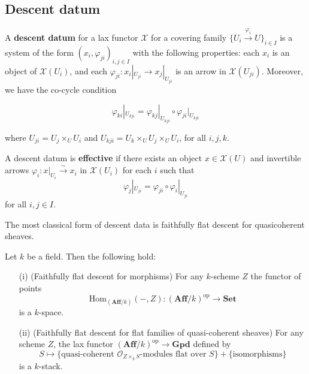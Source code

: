 \documentclass[12pt]{article}
\begin{document}
\subsection{Descent datum}
\begin{definition}
    A \textbf{descent datum} for a lax functor $\mathcal{X}$ for a covering family $\{ U_i \xrightarrow{\varphi_i} U \}_{i \in I}$ is a system of the form
    $(x_i, \varphi_{ji})_{i,j \in I}$ with the following properties: each $x_i$ is an object of $\mathcal{X}(U_i)$, and each
    $\varphi_{ji} : x_i|_{U_{ji}} \to x_j|_{U_{ji}}$ is an arrow in $\mathcal{X}(U_{ji})$. Moreover, we have the co-cycle condition

    \[
        \varphi_{ki}|_{U_{kji}} = \varphi_{kj}|_{U_{kji}} \circ \varphi_{ji}|_{U_{kji}}
    \]

    where $U_{ji} = U_j \times_U U_i$ and $U_{kji} = U_k \times_U U_j \times_U U_i$, for all $i,j,k$.

    A descent datum is \textbf{effective} if there exists an object $x \in \mathcal{X}(U)$ and invertible arrows
    $\varphi_i : x|_{U_i} \xrightarrow{\sim} x_i$ in $\mathcal{X}(U_i)$ for each $i$ such that
    \[
        \varphi_j|_{U_{ji}} = \varphi_{ji} \circ \varphi_i|_{U_{ji}}
    \]
    for all $i,j \in I$.
\end{definition}
The most classical form of descent data is faithfully flat descent for quasicoherent sheaves.
\begin{theorem}
    Let $k$ be a field. Then the following hold:
    \begin{enumerate}
        \item[(i)] (Faithfully flat descent for morphisms) For any $k$-scheme $Z$ the functor of points
              \[
                  \mathrm{Hom}_{(\mathbf{Aff}/k)}(-, Z) : (\mathbf{Aff}/k)^{\mathrm{op}} \to \mathbf{Set}
              \]
              is a $k$-space.

        \item[(ii)] (Faithfully flat descent for flat families of quasi-coherent sheaves) For any scheme $Z$, the lax functor $(\mathbf{Aff}/k)^{\mathrm{op}} \to \mathbf{Gpd}$ defined by
              \[
                  S \mapsto \{\text{quasi-coherent } \mathcal{O}_{Z \times_k S}\text{-modules flat over } S\} + \{\text{isomorphisms}\}
              \]
              is a $k$-stack.
    \end{enumerate}
\end{theorem}
\end{document}
